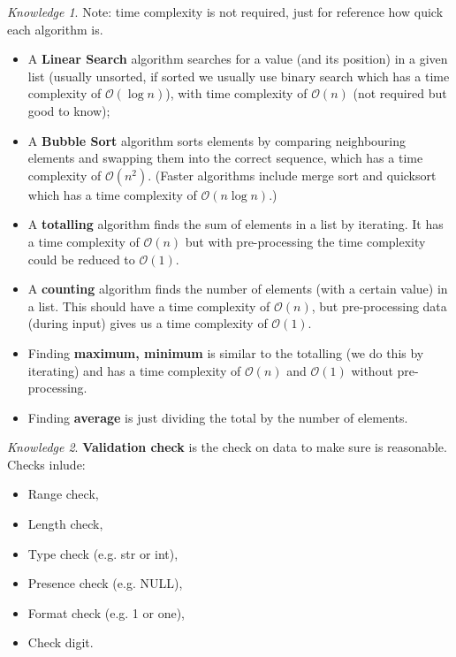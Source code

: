 \documentclass[8pt]{article}
\theoremstyle{remark}
\newtheorem{knowledge}{Knowledge}[subsection]
\begin{document}
        \begin{knowledge}
            Note: time complexity is not required, just for reference how quick each algorithm is.
            \begin{itemize}
                \item A \textbf{Linear Search} algorithm searches for a value (and its position) in a given list (usually unsorted, if sorted we usually use binary search which has a time complexity of $\mathcal{O}(\log n)$), with time complexity of $\mathcal{O}(n)$ (not required but good to know);
                \item A \textbf{Bubble Sort} algorithm sorts elements by comparing neighbouring elements and swapping them into the correct sequence, which has a time complexity of $\mathcal{O}(n^2)$. (Faster algorithms include merge sort and quicksort which has a time complexity of $\mathcal{O}(n \log n)$.)
                \item A \textbf{totalling} algorithm finds the sum of elements in a list by iterating. It has a time complexity of $\mathcal{O}(n)$ but with pre-processing the time complexity could be reduced to $\mathcal{O}(1)$.
                \item A \textbf{counting} algorithm finds the number of elements (with a certain value) in a list. This should have a time complexity of $\mathcal{O}(n)$, but pre-processing data (during input) gives us a time complexity of $\mathcal{O}(1)$.
                \item Finding \textbf{maximum, minimum} is similar to the totalling (we do this by iterating) and has a time complexity of $\mathcal{O}(n)$ and $\mathcal{O}(1)$ without pre-processing.
                \item Finding \textbf{average} is just dividing the total by the number of elements.
            \end{itemize}
        \end{knowledge}

        \begin{knowledge}
            \textbf{Validation check} is the check on data to make sure is reasonable. Checks inlude:
            \begin{itemize}
                \item Range check,
                \item Length check,
                \item Type check (e.g. str or int),
                \item Presence check (e.g. NULL),
                \item Format check (e.g. 1 or one),
                \item Check digit.
            \end{itemize}
        \end{knowledge}
\end{document}
